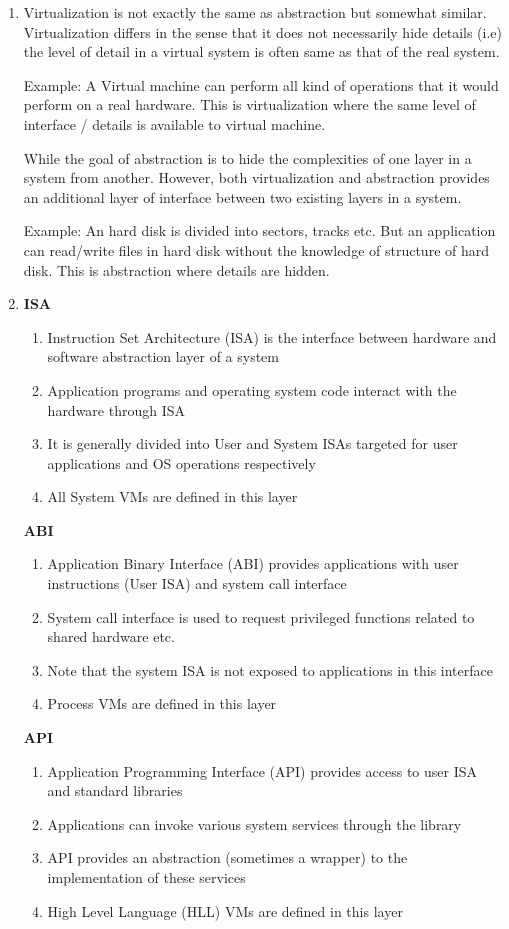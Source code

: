 \documentclass[11pt,a4paper,oneside]{article}
\begin{document}
\begin{enumerate}
		\item Virtualization is not exactly the same as abstraction but somewhat similar. Virtualization differs in the sense that it does not necessarily hide details (i.e) the level of detail in a virtual system is often same as that of the real system.
		
		Example: A Virtual machine can perform all kind of operations that it would perform on a real hardware. This is virtualization where the same level of interface / details is available to virtual machine.
		
		While the goal of abstraction is to hide the complexities of one layer in a system from another. However, both virtualization and abstraction provides an additional layer of interface between two existing layers in a system.
		
	    Example: An hard disk is divided into sectors, tracks etc. But an application can read/write files in hard disk without the knowledge of structure of hard disk. This is abstraction where details are hidden.	     
		
		\item \textbf{ISA} 
		\begin{enumerate}
			\item Instruction Set Architecture (ISA) is the interface between hardware and software abstraction layer of a system
			\item Application programs and operating system code interact with the hardware through ISA
			\item It is generally divided into User and System ISAs targeted for user applications and OS operations respectively
			\item All System VMs are defined in this layer
		\end{enumerate}    
		
		\textbf{ABI}
		\begin{enumerate}
			\item Application Binary Interface (ABI) provides applications with user instructions (User ISA) and system call interface
			\item System call interface is used to request privileged functions related to shared hardware etc.
			\item Note that the system ISA is not exposed to applications in this interface
			\item Process VMs are defined in this layer
		\end{enumerate}   
		
		\textbf{API}
		\begin{enumerate}
			\item Application Programming Interface (API) provides access to user ISA and standard libraries
			\item Applications can invoke various system services through the library
			\item API provides an abstraction (sometimes a wrapper) to the implementation of these services
			\item High Level Language (HLL) VMs are defined in this layer
		\end{enumerate}
	

\end{enumerate}
\end{document}
